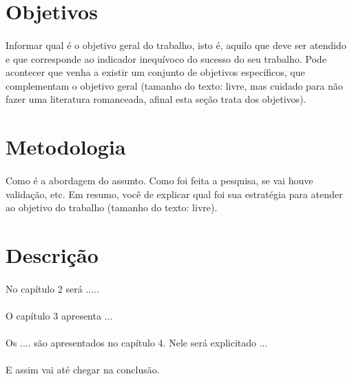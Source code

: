 \section{Objetivos}

\paragraph{}Informar qual é o objetivo geral do trabalho, isto é, aquilo que deve ser atendido e que corresponde ao indicador inequívoco do sucesso do seu trabalho. Pode acontecer que venha a existir um conjunto de objetivos específicos, que complementam o objetivo geral (tamanho do texto: livre, mas cuidado para não fazer uma literatura romanceada, afinal esta seção trata dos objetivos).


\section{Metodologia}

\paragraph{}Como é a abordagem do assunto. Como foi feita a pesquisa, se vai houve validação, etc. Em resumo, você de explicar qual foi sua estratégia para atender ao objetivo do trabalho (tamanho do texto: livre).


\section{Descrição}

\paragraph{}No capítulo 2 será .....

\paragraph{}O capítulo 3 apresenta ...

\paragraph{}Os .... são apresentados no capítulo 4. Nele será explicitado ...

\paragraph{}E assim vai até chegar na conclusão.
